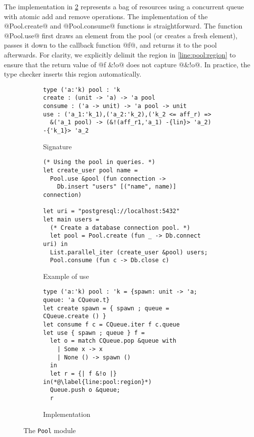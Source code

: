 The implementation in \cref{impl:pool} represents a bag of resources
using a concurrent queue with atomic add and remove operations.
The implementation of the @Pool.create@ and @Pool.consume@
functions is straightforward.
The function @Pool.use@ first draws
an element from the pool (or creates a fresh element),
passes it down to the callback function @f@, and returns
it to the pool afterwards.
For clarity,
we explicitly delimit the region in \cref{line:pool:region} to ensure that
the return value of @f &!o@ does not capture @&!o@.
In practice, the type checker inserts this region automatically.

\begin{figure}[tp]
  \centering
  \begin{subfigure}[t]{1\linewidth}
\begin{lstlisting}
type ('a:'k) pool : 'k
create : (unit -> 'a) -> 'a pool
consume : ('a -> unit) -> 'a pool -> unit
use : ('a_1:'k_1),('a_2:'k_2),('k_2 <= aff_r) =>
  &('a_1 pool) -> (&!(aff_r1,'a_1) -{lin}> 'a_2) -{'k_1}> 'a_2
\end{lstlisting}
    \vspace{-10pt}
    \caption{Signature}
    \label{intf:pool}

\begin{lstlisting}
(* Using the pool in queries. *)
let create_user pool name =
  Pool.use &pool (fun connection ->
    Db.insert "users" [("name", name)] connection)

let uri = "postgresql://localhost:5432"
let main users =
  (* Create a database connection pool. *)
  let pool = Pool.create (fun _ -> Db.connect uri) in
  List.parallel_iter (create_user &pool) users;
  Pool.consume (fun c -> Db.close c)
\end{lstlisting}
    \vspace{-10pt}
    \caption{Example of use}
    \label{ex:pool}
  \end{subfigure}

  \begin{subfigure}[t]{1\linewidth}
\begin{lstlisting}
type ('a:'k) pool : 'k = {spawn: unit -> 'a; queue: 'a CQueue.t}
let create spawn = { spawn ; queue = CQueue.create () }
let consume f c = CQueue.iter f c.queue
let use { spawn ; queue } f =
  let o = match CQueue.pop &queue with
    | Some x -> x
    | None () -> spawn ()
  in
  let r = {| f &!o |} in(*@\label{line:pool:region}*)
  Queue.push o &queue;
  r
\end{lstlisting}
    \vspace{-15pt}
    \caption{Implementation}
    \label{impl:pool}
  \end{subfigure}

  \caption{The \texttt{Pool} module}
  \label{fig:pool}
\end{figure}

\lstDeleteShortInline@

